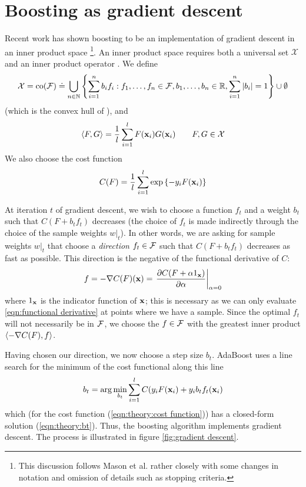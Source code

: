 \section{Boosting as gradient descent}
\label{sec:theory:gradient descent}

Recent work has shown boosting to be an implementation of gradient
descent in an inner product space \cite{Mason99}\footnote{This
discussion follows Mason et al. \cite{Mason99} rather closely with
some changes in notation and omission of details such as stopping
criteria.}.
An inner product space requires both a universal set
$\mathcal{X}$ and an inner product operator \ip{\cdot}{\cdot}.  We
define
%
\begin{equation}
\mathcal{X} = 
\mathrm{co} (\mathcal{F}) \doteq
 \bigcup _{n \in \mathbb{N}}
\left\{
 \sum_{i=1}^{n}
  b_i
f_i : f_1, \ldots, f_n \in \mathcal{F},
 b_1, \ldots, b_n \in \mathbb{R},
 \sum_{i=1}^{n} | b_i | = 1
\right\} \cup \emptyset
\end{equation}
%
(which is the convex hull of \calF), and
%
\begin{equation}
\langle {F} , {G} \rangle = \frac{1}{l} \sum_{i=1}^{l} F(\mathbf{x}_i)G(\mathbf{x}_i) \qquad
F, G \in \mathcal{X}
\end{equation}
%
We also choose the cost function
%
\begin{equation}
C(F) = \frac{1}{l} \sum_{i=1}^{l} \exp
\left\{ -y_i F(\mathbf{x}_i) \right\}
\label{eqn:theory:cost function}
\end{equation}

At iteration $t$ of gradient descent, we wish to choose a function $f_t$ and
a weight $b_t$ such that $C(F + b_t f_t)$ decreases (the choice of
$f_t$ is made indirectly through the choice of the sample weights
$w|_t$).  In other words, we are asking for sample weights $w|_t$ that
choose a \emph{direction} $f_t \in \mathcal{F}$ such that $C(F + b_t f_t)$
decreases as fast as possible.  This direction is the negative of the
functional derivative of $C$:
%
\begin{equation}
f = -\nabla C(F)(\mathbf{x}) = \left. \frac{\partial C(F + \alpha
1_{\mathbf{x}})}{\partial \alpha} \right|_{\alpha = 0}
\label{eqn:functional derivative}
\end{equation}
%
where $1_{\mathbf{x}}$ is the indicator function of $\mathbf{x}$; this is
necessary as we can only evaluate \ref{eqn:functional derivative} at
points where we have a sample.  Since the
optimal $f_t$ will not necessarily be in $\mathcal{F}$, we choose the
$f \in \mathcal{F}$ with the greatest inner product $\langle {-\nabla
C(F)} , {f} \rangle$.

Having chosen our direction, we now choose a step size $b_t$.
AdaBoost uses a line search for the minimum of the cost functional
along this line
%
\begin{equation}
b_t = \arg \min_{b_t} \sum_{i=1}^{l} C(y_i F(\mathbf{x}_i) + y_i b_t f_t(\mathbf{x}_i)
\end{equation}
%
which (for the cost function (\ref{eqn:theory:cost
function})) has a closed-form solution  (\ref{eqn:theory:bt}).  Thus, the
boosting algorithm implements gradient descent.  The process is
illustrated in figure \ref{fig:gradient descent}.

